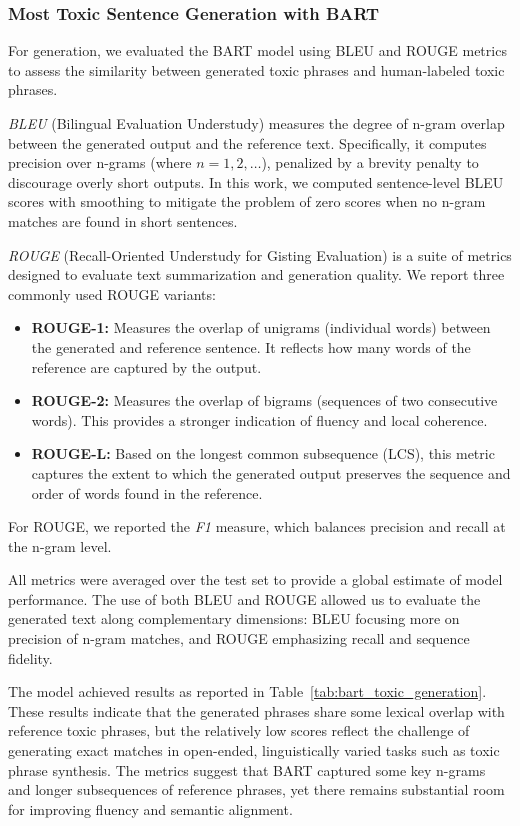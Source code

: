 \documentclass[conference]{IEEEtran}
\begin{document}
\subsubsection{Most Toxic Sentence Generation with BART}
\noindent

For generation, we evaluated the BART model using BLEU and ROUGE metrics to assess the similarity between generated toxic phrases and human-labeled toxic phrases. 

\emph{BLEU} (Bilingual Evaluation Understudy) \cite{BLEU2002} measures the degree of n-gram overlap between the generated output and the reference text. Specifically, it computes precision over n-grams (where $n=1,2,\dots$), penalized by a brevity penalty to discourage overly short outputs. In this work, we computed sentence-level BLEU scores with smoothing to mitigate the problem of zero scores when no n-gram matches are found in short sentences.

\emph{ROUGE} (Recall-Oriented Understudy for Gisting Evaluation) \cite{ROUGE2004} is a suite of metrics designed to evaluate text summarization and generation quality. We report three commonly used ROUGE variants:
\begin{itemize}
    \item \textbf{ROUGE-1:} Measures the overlap of unigrams (individual words) between the generated and reference sentence. It reflects how many words of the reference are captured by the output.
    \item \textbf{ROUGE-2:} Measures the overlap of bigrams (sequences of two consecutive words). This provides a stronger indication of fluency and local coherence.
    \item \textbf{ROUGE-L:} Based on the longest common subsequence (LCS), this metric captures the extent to which the generated output preserves the sequence and order of words found in the reference.
\end{itemize}
For ROUGE, we reported the \emph{F1} measure, which balances precision and recall at the n-gram level.

All metrics were averaged over the test set to provide a global estimate of model performance. The use of both BLEU and ROUGE allowed us to evaluate the generated text along complementary dimensions: BLEU focusing more on precision of n-gram matches, and ROUGE emphasizing recall and sequence fidelity.

The model achieved results as reported in Table~\ref{tab:bart_toxic_generation}. These results indicate that the generated phrases share some lexical overlap with reference toxic phrases, but the relatively low scores reflect the challenge of generating exact matches in open-ended, linguistically varied tasks such as toxic phrase synthesis. The metrics suggest that BART captured some key n-grams and longer subsequences of reference phrases, yet there remains substantial room for improving fluency and semantic alignment.
\end{document}
